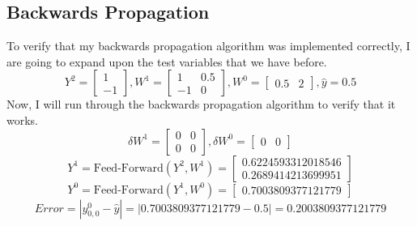\documentclass[10pt]{article}
\begin{document}
\subsection{Backwards Propagation}
To verify that my backwards propagation algorithm was implemented correctly, I are going to expand upon the test variables that we have before.
$$Y^2 = \begin{bmatrix}1 \\ -1\end{bmatrix}, W^1 = \begin{bmatrix}1 & 0.5 \\ -1 & 0\end{bmatrix},W^0 = \begin{bmatrix}0.5 & 2\end{bmatrix},\hat{y} = 0.5$$
Now, I will run through the backwards propagation algorithm to verify that it works. 
$$\delta W^1 = \begin{bmatrix}0&0\\0&0\end{bmatrix}, \delta W^0 = \begin{bmatrix}0&0\end{bmatrix}$$
$$Y^1 = \text{Feed-Forward}(Y^2,W^1) = \begin{bmatrix}0.6224593312018546\\0.2689414213699951\end{bmatrix}$$
$$Y^0 = \text{Feed-Forward}(Y^1,W^0) = \begin{bmatrix}0.7003809377121779\end{bmatrix}$$
$$Error = |y^0_{0,0} - \hat{y} | = |0.7003809377121779 - 0.5| = 0.2003809377121779$$
\end{document}
